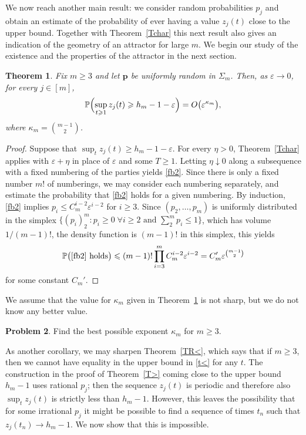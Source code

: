 \documentclass[11pt,reqno,tbtags,a4paper]{amsart}
\numberwithin{equation}{section}
\renewcommand\le{\leq}
\renewcommand\ge{\geq}
\renewcommand\leq{\leqslant}
\renewcommand\geq{\geqslant}
\theoremstyle{plain}%
\newtheorem{theorem}{Theorem}[section]
\theoremstyle{definition}
\newtheorem{problem}[theorem]{Problem}
\theoremstyle{remark}
\newcommand{\refT}[1]{Theorem~\ref{#1}}
\newcommand\set[1]{\ensuremath{\{#1\}}}
\newcommand\bigpar[1]{\bigl(#1\bigr)}
\newcommand\Bigpar[1]{\Bigl(#1\Bigr)}
\newcounter{cc}
\renewcommand\P{\operatorname{\mathbb P{}}}
\newcommand\kk{\kappa}
\newcommand\gS{\Sigma}
\newcommand\eps{\varepsilon}
\newcommand\vp{\mathbf{p}}
\newcommand\0{{\boldsymbol 0}}
\newcommand\1{{\boldsymbol 1}}
\begin{document}
We now reach another main result: 
we consider random probabilities $p_j$ and
obtain an estimate of the probability of ever having a
value $z_j(t)$ close to the upper bound. Together with \refT{Tchar} this
next result also gives an indication  
of the geometry of an attractor for large $m$. We begin our study of the existence and the properties of the
attractor in the next section. 
\begin{theorem}\label{Tchar2}
  Fix $m\ge3$ and let $\vp$ be uniformly random in $\gS_m$.
Then, as $\eps\to0$, for every $j\in[m]$,
\begin{align}\label{cchar}
  \P\Bigpar{\sup_{t\ge1}z_j(t) \ge h_m-1-\eps}
= O\bigpar{\eps^{\kk_m}}
,\end{align}
where $\kk_m=\binom{m-1}2$.
\end{theorem}

\begin{proof}
  Suppose that $\sup_t z_j(t)\ge h_m-1-\eps$.
For every $\eta>0$, \refT{Tchar} applies with $\eps+\eta$ in place of $\eps$
and some $T\ge1$.
Letting $\eta\downarrow0$ along a subsequence with a fixed numbering of the
parties yields \eqref{fb2}. Since there is only a fixed
  number $m!$ of numberings, we may consider each numbering separately, 
and estimate the probability that \eqref{fb2} holds for a given numbering.
By induction, \eqref{fb2} implies $p_i \le C_{m}^{i-2} \eps^{i-2}$ for $i\ge3$.
Since $(p_2,\dots,p_m)$ is uniformly distributed in the simplex 
$\set{(p_i)_2^m:p_i\ge0\;\forall i\ge2\text{ and }\sum_2^m p_i\le1}$,
which has volume $1/(m-1)!$, the density function is $(m-1)!$ in this simplex,
this yields
\begin{align}
  \P\bigpar{\text{\eqref{fb2} holds}}
\le (m-1)! \prod_{i=3}^m C_m^{i-2}\eps^{i-2}
= C_m' \eps^{\binom {m-1}2}
\end{align}
for some constant $C_m'$.
\end{proof}

%
%
%
%
%

We assume that the value for $\kk_m$ given in \refT{Tchar2} is not sharp,
but we do not know any better value.

\begin{problem}\label{Pchar}
  Find the best possible exponent $\kk_m$ for $m\ge3$.
\end{problem}

As another corollary, we may sharpen \refT{TR<},
which says that if $m\ge3$, then we cannot have equality in the upper bound
in \eqref{t<} for any $t$. 
The construction in the proof of \refT{T>} coming
close to the upper bound $h_m-1$
uses rational $p_j$; then the sequence $z_j(t)$ is periodic and therefore
also
$\sup_t z_j(t)$ is strictly less than $h_m-1$. However, this leaves the
possibility that for some irrational $p_j$ it might be possible to find a
sequence of times $t_n$ such that $z_j(t_n)\to h_m-1$.
We now show that this is impossible.
\end{document}
